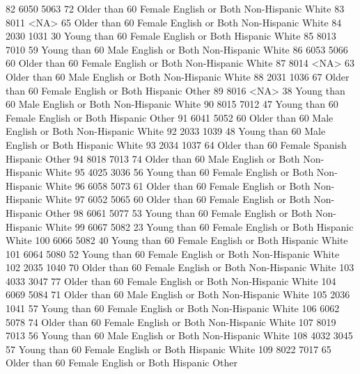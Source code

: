 \documentclass[
  letterpaper,
  DIV=11,
  numbers=noendperiod]{scrreprt}
\newenvironment{Shaded}{\begin{snugshade}}{\end{snugshade}}
\newcommand{\NormalTok}[1]{\textcolor[rgb]{0.00,0.23,0.31}{#1}}
\begin{document}
\begin{Shaded}
\begin{Highlighting}[]
\NormalTok{82  6050 5063  72 Older than 60 Female English or Both Non{-}Hispanic      White}
\NormalTok{83  8011 \textless{}NA\textgreater{}  65 Older than 60 Female English or Both Non{-}Hispanic      White}
\NormalTok{84  2030 1031  30 Young than 60 Female English or Both     Hispanic      White}
\NormalTok{85  8013 7010  59 Young than 60   Male English or Both Non{-}Hispanic      White}
\NormalTok{86  6053 5066  60 Older than 60 Female English or Both Non{-}Hispanic      White}
\NormalTok{87  8014 \textless{}NA\textgreater{}  63 Older than 60   Male English or Both Non{-}Hispanic      White}
\NormalTok{88  2031 1036  67 Older than 60 Female English or Both     Hispanic      Other}
\NormalTok{89  8016 \textless{}NA\textgreater{}  38 Young than 60   Male English or Both Non{-}Hispanic      White}
\NormalTok{90  8015 7012  47 Young than 60 Female English or Both     Hispanic      Other}
\NormalTok{91  6041 5052  60 Older than 60   Male English or Both Non{-}Hispanic      White}
\NormalTok{92  2033 1039  48 Young than 60   Male English or Both     Hispanic      White}
\NormalTok{93  2034 1037  64 Older than 60 Female         Spanish     Hispanic      Other}
\NormalTok{94  8018 7013  74 Older than 60   Male English or Both Non{-}Hispanic      White}
\NormalTok{95  4025 3036  56 Young than 60 Female English or Both Non{-}Hispanic      White}
\NormalTok{96  6058 5073  61 Older than 60 Female English or Both Non{-}Hispanic      White}
\NormalTok{97  6052 5065  60 Older than 60 Female English or Both Non{-}Hispanic      Other}
\NormalTok{98  6061 5077  53 Young than 60 Female English or Both Non{-}Hispanic      White}
\NormalTok{99  6067 5082  23 Young than 60 Female English or Both     Hispanic      White}
\NormalTok{100 6066 5082  40 Young than 60 Female English or Both     Hispanic      White}
\NormalTok{101 6064 5080  52 Young than 60 Female English or Both Non{-}Hispanic      White}
\NormalTok{102 2035 1040  70 Older than 60 Female English or Both Non{-}Hispanic      White}
\NormalTok{103 4033 3047  77 Older than 60 Female English or Both Non{-}Hispanic      White}
\NormalTok{104 6069 5084  71 Older than 60   Male English or Both Non{-}Hispanic      White}
\NormalTok{105 2036 1041  57 Young than 60 Female English or Both Non{-}Hispanic      White}
\NormalTok{106 6062 5078  74 Older than 60 Female English or Both Non{-}Hispanic      White}
\NormalTok{107 8019 7013  56 Young than 60   Male English or Both Non{-}Hispanic      White}
\NormalTok{108 4032 3045  57 Young than 60 Female English or Both     Hispanic      White}
\NormalTok{109 8022 7017  65 Older than 60 Female English or Both     Hispanic      Other}

\end{Highlighting}
\end{Shaded}
\end{document}
